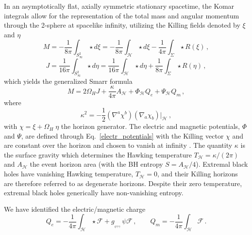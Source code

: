 \documentclass[11pt]{article}
\numberwithin{equation}{section} %
\begin{document}
In an asymptotically flat, axially symmetric stationary spacetime, the Komar integrals allow for the representation of the total mass and angular momentum through the 2-sphere at spacelike infinity, utilizing the Killing fields denoted by $\xi$ and $\eta$
%
\begin{equation}\label{mass_komar}
    M=- \dfrac{1}{8\pi}\int_{S^2_{\infty}}\star d\xi=- \dfrac{1}{8\pi}\int_{\mathcal{H}}\star d\xi - \dfrac{1}{4\pi}\int_{\Sigma}\star R(\xi)\,,
\end{equation}
%
\begin{equation}\label{ang_komar}
    J= \dfrac{1}{16\pi}\int_{S^2_{\infty}}\star d\eta= \dfrac{1}{16\pi}\int_{\mathcal{H}}\star d\eta + \dfrac{1}{8\pi}\int_{\Sigma}\star R(\eta)\, ,
\end{equation}
%
which yields  the generalized Smarr formula   {\cite{Carter:2009nex,heusler_1996,RASHEED1995379,Kleihaus:2003sh,Compere:2007vx,Ortin:2022uxa,PhysRevLett.30.71,Bardeen:1973gs,Astefanesei:2018vga}}
\begin{equation}\label{mass_formula}
    M=2\Omega_H J + \dfrac{\kappa}{4\pi}A_{\mathcal{H}}+ \Phi_{\mathcal{H}} Q_e + \Psi_{\mathcal{H}} Q_m \, ,
\end{equation}
%
where
%
\begin{equation}
\kappa^2=-\frac{1}{2}(\nabla^a \chi^b)\left(\nabla_a \chi_b\right)\Big|_{\mathcal{H}}~,
\end{equation}
with $\chi=\xi+\Omega_H\;\eta$ the horizon generator. The electric and magnetic potentials, $\Phi$ and $\Psi$, are defined through Eq.~\eqref{electr_potentials} with the Killing vector $\chi$ and are constant over the horizon and chosen to vanish at infinity \cite{Prabhu:2015vua,Hajian:2022lgy}. The quantity  $\kappa$ is the surface gravity which determines the 
Hawking temperature $T_{\mathcal{H}}=\kappa/(2\pi)$
and $A_{\mathcal{H}}$
the event horizon area
(with the BH entropy $S=A_{\mathcal{H}}/4$).  Extremal black holes have vanishing Hawking temperature, $T_{\mathcal{H}}=0$, and their
Killing horizons are therefore referred to as degenerate horizons. Despite their zero temperature,
extremal black holes generically have non-vanishing entropy.


We have identified the electric/magnetic charge
%
\begin{equation}\label{Qe_QM}
    Q_e= -\dfrac{1}{4\pi}\int_{\mathcal{H}}\star\mathcal{F}+g_{_{\psi\gamma\gamma}}\,\psi \mathcal{F}\,,\qquad Q_m=-\dfrac{1}{4\pi}\int_{\mathcal{H}}\mathcal{F}\,.
\end{equation}
\end{document}
